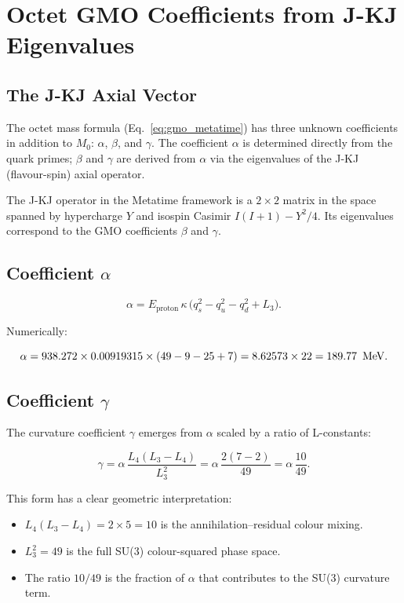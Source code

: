 \chapter{Octet GMO Coefficients from J-KJ Eigenvalues}
\label{ch:octet_coefficients}

\section{The J-KJ Axial Vector}

The octet mass formula (Eq.~\eqref{eq:gmo_metatime}) has three unknown
coefficients in addition to \(M_0\): \(\alpha\), \(\beta\), and
\(\gamma\).  The coefficient \(\alpha\) is determined directly from the
quark primes; \(\beta\) and \(\gamma\) are derived from \(\alpha\) via
the eigenvalues of the J-KJ (flavour-spin) axial operator.

The J-KJ operator in the Metatime framework is a \(2\times 2\) matrix
in the space spanned by hypercharge \(Y\) and isospin Casimir
\(I(I+1) - Y^2/4\).  Its eigenvalues correspond to the GMO coefficients
\(\beta\) and \(\gamma\).

\section{Coefficient \(\alpha\)}

\begin{equation}
\alpha = E_{\text{proton}}\,\kappa\,
\bigl(q_s^2 - q_u^2 - q_d^2 + L_3\bigr).
\label{eq:alpha}
\end{equation}

Numerically:

\[
\alpha = 938.272 \times 0.00919315 \times (49 - 9 - 25 + 7)
       = 8.62573 \times 22
       = 189.77\ \,\text{MeV}.
\]

\section{Coefficient \(\gamma\)}

The curvature coefficient \(\gamma\) emerges from \(\alpha\) scaled by a
ratio of L-constants:

\begin{equation}
\gamma = \alpha\,\frac{L_4(L_3 - L_4)}{L_3^2}
       = \alpha\,\frac{2(7-2)}{49}
       = \alpha\,\frac{10}{49}.
\label{eq:gamma}
\end{equation}

This form has a clear geometric interpretation:
\begin{itemize}
\item \(L_4(L_3 - L_4) = 2 \times 5 = 10\) is the annihilation--residual
colour mixing.
\item \(L_3^2 = 49\) is the full SU(3) colour-squared phase space.
\item The ratio \(10/49\) is the fraction of \(\alpha\) that contributes
to the SU(3) curvature term.
\end{itemize}

